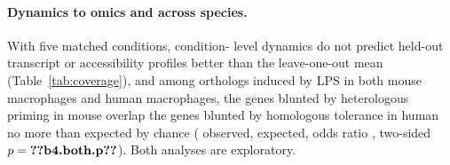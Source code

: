 \paragraph{Dynamics to omics and across species.} With five matched conditions, condition-
level dynamics do not predict held-out transcript or accessibility profiles better than the
leave-one-out mean (Table~\ref{tab:coverage}), and among  orthologs induced
by LPS in both mouse macrophages and human macrophages, the genes blunted by heterologous
priming in mouse overlap the genes blunted by homologous tolerance in human no more than
expected by chance ( observed,  expected, odds ratio
, two-sided $p=\val{b4.both.p}$). Both analyses are exploratory.
